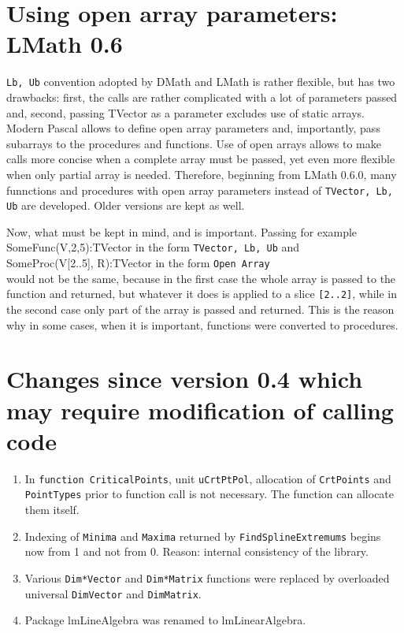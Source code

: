 \documentclass[12pt,a4paper,oneside]{article}
\newcommand{\code}[1]{\texttt{#1}}
\begin{document}
\section{Using open array parameters: LMath 0.6}
\code{Lb, Ub} convention adopted by DMath and LMath is rather flexible, but has two drawbacks: first, the calls are rather complicated with a lot of parameters passed and, second, passing TVector as a parameter excludes use of static arrays. Modern Pascal allows to define open array parameters and, importantly, pass subarrays to the procedures and functions. Use of open arrays allows to make calls more concise when a complete array must be passed, yet even more flexible when only partial array is needed. Therefore, beginning from LMath 0.6.0, many funnctions and procedures with open array parameters instead of \code{TVector, Lb, Ub} are developed. Older versions are kept as well.

Now, what must be kept in mind, and is important. Passing for example \\
SomeFunc(V,2,5):TVector in the form \code{TVector, Lb, Ub} and \\
SomeProc(V[2..5], R):TVector in the form \code{Open Array} \\ would not be the same, because in the first case the whole array is passed to the function and returned, but whatever it does is applied to a slice \code{[2..2]}, while in the second case only part of the array is passed and returned. This is the reason why in some cases, when it is important, functions were converted to procedures.  
  
\section{Changes since version 0.4 which may require modification of calling code}
\begin{enumerate}
	\item In \code{function CriticalPoints}, unit \code{uCrtPtPol}, allocation of \code{CrtPoints} and \code{PointTypes} prior to function call is not necessary. The function can allocate them itself.
	\item Indexing of \code{Minima} and \code{Maxima} returned by \code{FindSplineExtremums} begins now from 1 and not from 0. Reason: internal consistency of the library.
	\item Various \code{Dim*Vector} and \code{Dim*Matrix} functions were replaced by overloaded universal \code{DimVector} and \code{DimMatrix}.
	\item Package lmLineAlgebra was renamed to lmLinearAlgebra.  
\end{enumerate}
\end{document}
